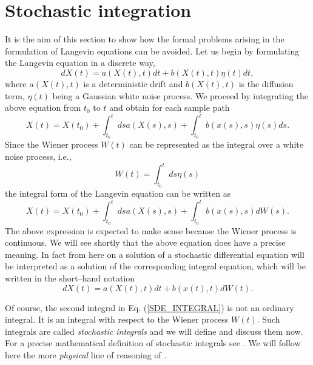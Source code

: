 \section{Stochastic integration}
It is the aim of this section to show how the formal problems
arising in the formulation of Langevin equations can be avoided.
Let us begin by formulating the Langevin equation in a discrete 
way,
\begin{equation*}
dX(t) = a(X(t),t) dt + b(X(t),t) \eta(t) dt,
\end{equation*}
where $a(X(t),t)$ is a deterministic drift and $b(X(t),t)$ is the 
diffusion term, $\eta(t)$ being a Gaussian white noise process.
We proceed by integrating the above equation from $t_0$ to $t$
and obtain for each sample path
\begin{equation*}
X(t) = X(t_0) + \int_{t_0}^t ds a(X(s),s) 
+ \int_{t_0}^t b(x(s),s) \eta(s) ds.
\end{equation*}
Since the Wiener process $W(t)$ can be represented as the integral
over a white noise process, i.e.,
\begin{equation}
W(t) = \int_{t_0}^t ds \eta(s)
\end{equation}
the integral form of the Langevin equation can be written as
\begin{equation}
\label{SDE_INTEGRAL}
X(t) = X(t_0) + \int_{t_0}^t ds a(X(s),s) 
+ \int_{t_0}^t b(x(s),s) dW(s).
\end{equation}
The above expression is 
expected to make sense because the Wiener process is continuous. 
We will see shortly that the above 
equation does have a precise meaning. In fact
from here on a solution of a stochastic differential equation will be 
interpreted as a solution 
of the corresponding integral equation, which will be written
in the short--hand notation
\begin{equation*}
dX(t) =   a(X(t),t) dt + b(x(t),t) dW(t).
\end{equation*}

Of course, the second integral in Eq. (\ref{SDE_INTEGRAL}) is not 
an ordinary integral.  It is an integral with respect to the 
Wiener process $W(t)$. Such integrals are called {\em stochastic 
integrals} and we will define and discuss them now. For a precise
mathematical definition of stochastic integrals see \cite{GARD, 
POTTER,KLOEDEN_AN,OETTINGER}. We will follow here the more
{\em physical} line of reasoning of \cite{gardiner}.

